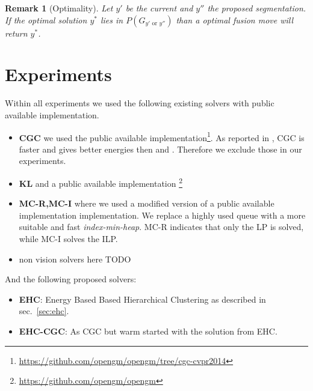 \documentclass[10pt,twocolumn,letterpaper]{article}
\newtheorem{remark}{Remark}
\newcommand{\OR}{\textrm{ or }}
\begin{document}
\begin{remark}[Optimality]
Let $y'$ be the current and $y''$ the proposed segmentation.
If the optimal solution $y^*$ lies in $P(G_{y' \OR y''})$ than a optimal fusion move will return $y^*$.
\end{remark}



\section{Experiments}\label{sec:exp}

Within all experiments we used the following existing solvers 
with public available implementation.
\begin{itemize}
    \item 
    \textbf{CGC} \cite{beier_2014_cvpr} we used the public available 
    implementation\footnote{\label{opengm-cvpr2014}\url{https://github.com/opengm/opengm/tree/cgc-cvpr2014}}.
    As reported in \cite{beier_2014_cvpr}, CGC is faster and gives better energies then \cite{yarkony_2012_eccv} and \cite{bagon_2011_arxiv}.
    Therefore we exclude those in our experiments.
    \item \textbf{KL}\cite{???}  and a public available 
        implementation \footnote{
            \label{opengm-master} 
            \url{https://github.com/opengm/opengm}
        }
    \item \textbf{MC-R,MC-I}\cite{kappes_2011_emmcvpr}  where we used a  modified 
    version of a public available implementation implementation.
    We replace a highly used queue with a more suitable and
    fast \emph{index-min-heap}\cite{???}.
    MC-R indicates that only the LP is solved, while MC-I solves
    the ILP.
    \item non vision solvers here TODO
\end{itemize}
And the following proposed solvers:
\begin{itemize}
\item \textbf{EHC}: Energy Based Based Hierarchical Clustering 
as described in sec.~\ref{sec:ehc}.
\item \textbf{EHC-CGC}: As CGC but warm started 
with the solution from EHC.
\end{itemize}
\end{document}
